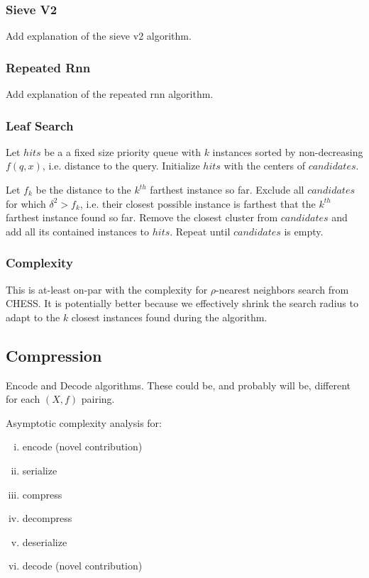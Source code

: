 \subsubsection{Sieve V2}
\label{subsubsec:methods:knn-search:sieve-v2}
Add explanation of the sieve v2 algorithm.

\subsubsection{Repeated Rnn}
\label{subsubsec:methods:knn-search:repeated-rnn}
Add explanation of the repeated rnn algorithm.

\subsubsection{Leaf Search}
\label{subsubsec:methods:knn-search:leaf-search}

Let $hits$ be a a fixed size priority queue with $k$ instances sorted by non-decreasing $f(q, x)$, i.e. distance to the query.
Initialize $hits$ with the centers of $candidates$.

Let $f_k$ be the distance to the $k^{th}$ farthest instance so far.
Exclude all $candidates$ for which $\delta^2 > f_k$, i.e. their closest possible instance is farthest that the $k^{th}$ farthest instance found so far.
Remove the closest cluster from $candidates$ and add all its contained instances to $hits$.
Repeat until $candidates$ is empty.

\subsubsection{Complexity}
\label{subsubsec:methods:knn-search:complexity}

This is at-least on-par with the complexity for $\rho$-nearest neighbors search from CHESS.
It is potentially better because we effectively shrink the search radius to adapt to the $k$ closest instances found during the algorithm.

\subsection{Compression}
\label{subsec:methods:compression}

Encode and Decode algorithms.
These could be, and probably will be, different for each $(X, f)$ pairing.

Asymptotic complexity analysis for:
\begin{enumerate}[i.]
    \item encode (novel contribution)
    \item serialize
    \item compress
    \item decompress
    \item deserialize
    \item decode (novel contribution)
\end{enumerate}

